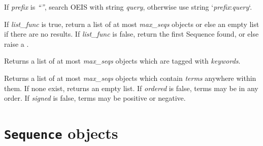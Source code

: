 \documentclass[letterpaper,10pt,english]{sphinxmanual}
\begin{document}
\begin{fulllineitems}
\begin{fulllineitems}
\end{fulllineitems}


\begin{fulllineitems}
\label{api:client.OEISClient.lookup_by}
If \emph{prefix} is \emph{``''}, search OEIS with string \emph{query},
otherwise use string `\emph{prefix}:\emph{query}`.

If \emph{list\_func} is true, return a list of at most
\emph{max\_seqs} {\hyperref[api:sequence.Sequence]{}} objects or else an
empty list if there are no results. If \emph{list\_func} is false, return
the first Sequence found, or else raise a
{\hyperref[api:errors.NoResultsError]{}}.

\end{fulllineitems}


\begin{fulllineitems}
\label{api:client.OEISClient.lookup_by_keywords}
Returns a list of at most \emph{max\_seqs}
{\hyperref[api:sequence.Sequence]{}} objects which are tagged with
\emph{keywords}.

\end{fulllineitems}


\begin{fulllineitems}
\label{api:client.OEISClient.lookup_by_terms}
Returns a list of at most \emph{max\_seqs}
{\hyperref[api:sequence.Sequence]{}} objects which contain \emph{terms}
anywhere within them. If none exist, returns an empty list. If
\emph{ordered} is false, terms may be in any order. If \emph{signed} is false,
terms may be positive or negative.

\end{fulllineitems}


\end{fulllineitems}



\section{\texttt{Sequence} objects}
\label{api:sequence-objects}
\end{document}
